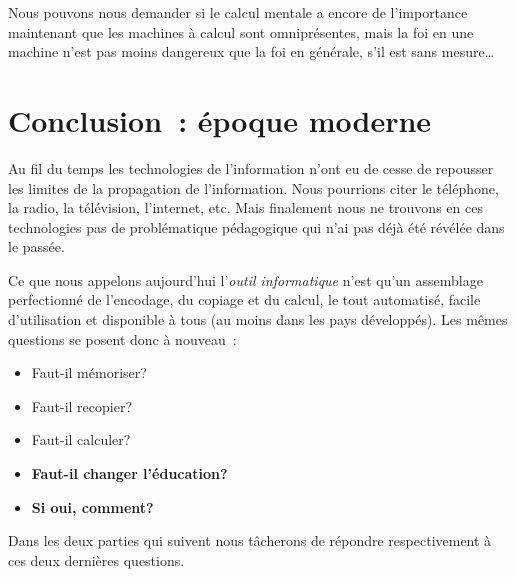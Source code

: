 Nous pouvons nous demander si le calcul mentale a encore de l'importance maintenant que les machines à calcul sont omniprésentes, mais la foi en une machine n'est pas moins dangereux que la foi en générale, s'il est sans mesure\ldots


\chapter*{Conclusion~: époque moderne}

Au fil du temps les technologies de l'information n'ont eu de cesse de repousser les limites de la propagation de l'information. Nous pourrions citer le téléphone, la radio, la télévision, l'internet, etc. Mais finalement nous ne trouvons en ces technologies pas de problématique pédagogique qui n'ai pas déjà été révélée dans le passée.

Ce que nous appelons aujourd'hui l'\emph{outil informatique} n'est qu'un assemblage perfectionné de l'encodage, du copiage et du calcul, le tout automatisé, facile d'utilisation et disponible à tous (au moins dans les pays développés). Les mêmes questions se posent donc à nouveau~:

\begin{itemize}
\Large
\item Faut-il mémoriser?

\item Faut-il recopier?

\item Faut-il calculer?

\item \textbf{Faut-il changer l'éducation?}

\item \textbf{Si oui, comment?}

\end{itemize}

Dans les deux parties qui suivent nous tâcherons de répondre respectivement à ces deux dernières questions.